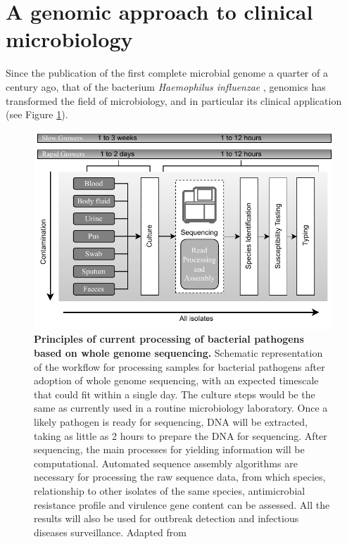 \section{A genomic approach to clinical microbiology} \label{sec:genomics_approach}

Since the publication of the first complete microbial genome a quarter of a century ago, that of the bacterium \textit{Haemophilus influenzae} \citep{hood_dna_1996}, genomics has transformed the field of microbiology, and in particular its clinical application (see Figure \ref{fig:figure3}). 

\begin{figure}[h!]
\centering
\includegraphics[width=\textwidth]{figures/introduction/Figure 3.pdf}
\caption{\textbf{Principles of current processing of bacterial pathogens based on whole genome sequencing.} Schematic representation of the workflow for processing samples for bacterial pathogens after adoption of whole genome sequencing, with an expected timescale that could fit within a single day. The culture steps would be the same as currently used in a routine microbiology laboratory. Once a likely pathogen is ready for sequencing, DNA will be extracted, taking as little as 2 hours to prepare the DNA for sequencing.
After sequencing, the main processes for yielding information will be computational. Automated sequence assembly algorithms are necessary for processing the raw sequence data, from which species, relationship to other isolates of the same species, antimicrobial resistance profile and virulence gene content can be assessed. All the results will also be used for outbreak detection and infectious diseases surveillance. Adapted from \cite{didelot_transforming_2012}}
\label{fig:figure3}
\end{figure}

